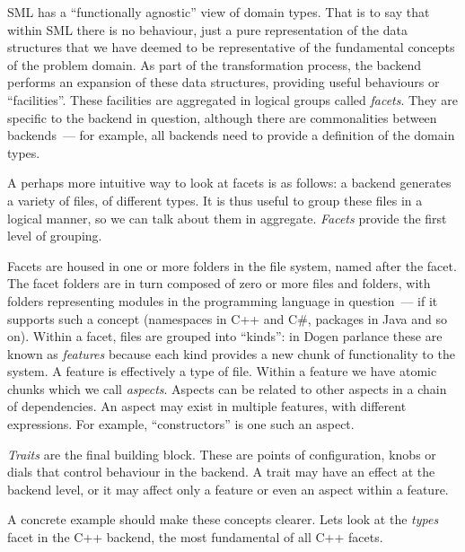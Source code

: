 \documentclass{book}
\begin{document}
SML has a ``functionally agnostic'' view of domain types. That is to
say that within SML there is no behaviour, just a pure representation
of the data structures that we have deemed to be representative of the
fundamental concepts of the problem domain. As part of the
transformation process, the backend performs an expansion of these
data structures, providing useful behaviours or ``facilities''. These
facilities are aggregated in logical groups called \emph{facets}. They
are specific to the backend in question, although there are
commonalities between backends~--- for example, all backends need to
provide a definition of the domain types.

A perhaps more intuitive way to look at facets is as follows: a
backend generates a variety of files, of different types. It is thus
useful to group these files in a logical manner, so we can talk about
them in aggregate. \emph{Facets} provide the first level of grouping.

Facets are housed in one or more folders in the file system, named
after the facet. The facet folders are in turn composed of zero or
more files and folders, with folders representing modules in the
programming language in question~--- if it supports such a concept
(namespaces in C++ and C\#, packages in Java and so on). Within a
facet, files are grouped into ``kinds'': in Dogen parlance these are
known as \emph{features} because each kind provides a new chunk of
functionality to the system. A feature is effectively a type of
file. Within a feature we have atomic chunks which we call
\emph{aspects}. Aspects can be related to other aspects in a chain of
dependencies. An aspect may exist in multiple features, with different
expressions. For example, ``constructors'' is one such an aspect.

\emph{Traits} are the final building block. These are points of
configuration, knobs or dials that control behaviour in the backend. A
trait may have an effect at the backend level, or it may affect only a
feature or even an aspect within a feature.

A concrete example should make these concepts clearer. Lets look at
the \emph{types} facet in the C++ backend, the most fundamental of all
C++ facets.
\end{document}
